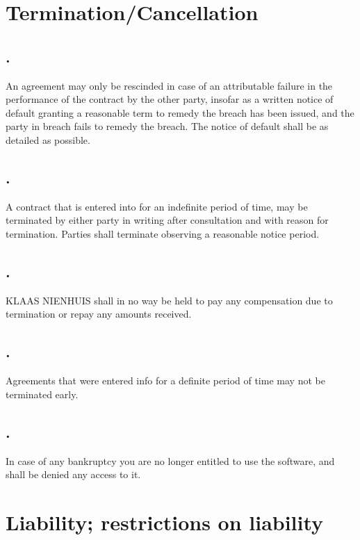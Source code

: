 \documentclass[letterpaper,10pt,english]{sphinxmanual}
\begin{document}
\chapter{Termination/Cancellation}
\label{Termination::doc}\label{Termination:termination-cancellation}

\section{.}
\label{Termination:id1}
An agreement may only be rescinded in case of an attributable failure in the performance of the contract by the other party, insofar as a written notice of default granting a reasonable term to remedy the breach has been issued, and the party in breach fails to remedy the breach. The notice of default shall be as detailed as possible.


\section{.}
\label{Termination:id2}
A contract that is entered into for an indefinite period of time, may be terminated by either party in writing after consultation and with reason for termination. Parties shall terminate observing a reasonable notice period.


\section{.}
\label{Termination:id3}
KLAAS NIENHUIS shall in no way be held to pay any compensation due to termination or repay any amounts received.


\section{.}
\label{Termination:id4}
Agreements that were entered info for a definite period of time may not be terminated early.


\section{.}
\label{Termination:id5}
In case of any bankruptcy you are no longer entitled to use the software, and shall be denied any access to it.


\chapter{Liability; restrictions on liability}
\label{Liability:liability-restrictions-on-liability}\label{Liability::doc}
\end{document}
